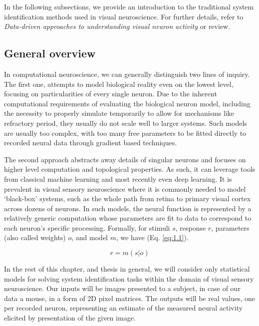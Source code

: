 In the following subsections, we provide an introduction to the traditional system identification methods used in visual neuroscience. For further details, refer to \textit{Data-driven approaches to understanding visual neuron activity} \citep{doi:10.1146/annurev-vision-091718-014731} or \cite{Carandini10577} review.

\subsection{General overview}

In computational neuroscience, we can generally distinguish two lines of inquiry. The first one, attempts to model biological reality even on the lowest level, focusing on particularities of every single neuron. Due to the inherent computational requirements of evaluating the biological neuron model, including the necessity to properly simulate temporarily to allow for mechanisms like refractory period, they usually do not scale well to larger systems. Such models are usually too complex, with too many free parameters to be fitted directly to recorded neural data through gradient based techniques. 

The second approach abstracts away details of singular neurons and focuses on higher level computation and topological properties. As such, it can leverage tools from classical machine learning and most recently even deep learning. It is prevalent in visual sensory neuroscience where it is commonly needed to model ‘black-box’ systems, such as the whole path from retina to primary visual cortex across dozens of neurons. In such models, the neural function is represented by a relatively generic computation whose parameters are fit to data to correspond to each neuron’s specific processing. Formally, for stimuli $s$, response $r$, parameters (also called weights) $o$, and model $m$, we have (Eq. \ref{eq:1.1}).

\begin{equation}\label{eq:1.1}
    r=m(s|o)
\end{equation}

In the rest of this chapter, and thesis in general, we will consider only statistical models for solving system identification tasks within the domain of visual sensory neuroscience. Our inputs will be images presented to a subject, in case of our data a mouse, in a form of 2D pixel matrices. The outputs will be real values, one per recorded neuron, representing an estimate of the measured neural activity elicited by presentation of the given image.

